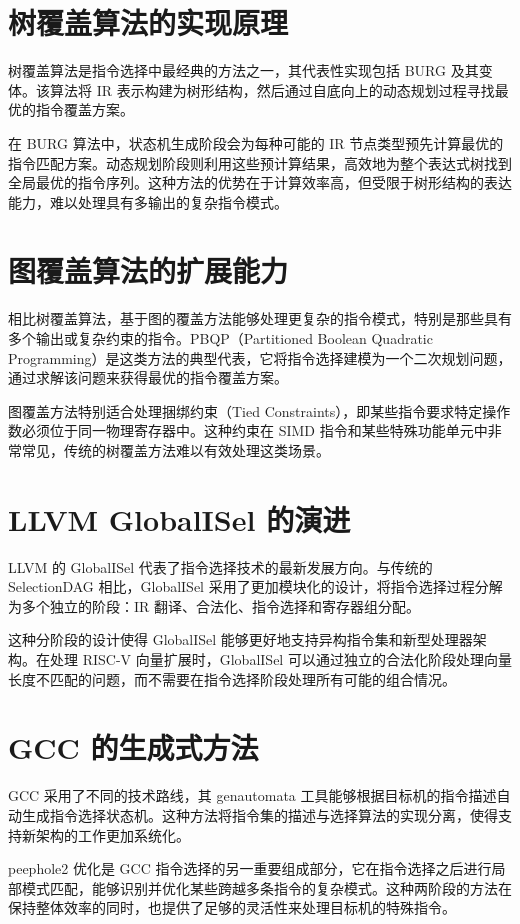 \section{树覆盖算法的实现原理}
树覆盖算法是指令选择中最经典的方法之一，其代表性实现包括 BURG 及其变体。该算法将 IR 表示构建为树形结构，然后通过自底向上的动态规划过程寻找最优的指令覆盖方案。\par
在 BURG 算法中，状态机生成阶段会为每种可能的 IR 节点类型预先计算最优的指令匹配方案。动态规划阶段则利用这些预计算结果，高效地为整个表达式树找到全局最优的指令序列。这种方法的优势在于计算效率高，但受限于树形结构的表达能力，难以处理具有多输出的复杂指令模式。\par
\section{图覆盖算法的扩展能力}
相比树覆盖算法，基于图的覆盖方法能够处理更复杂的指令模式，特别是那些具有多个输出或复杂约束的指令。PBQP（Partitioned Boolean Quadratic Programming）是这类方法的典型代表，它将指令选择建模为一个二次规划问题，通过求解该问题来获得最优的指令覆盖方案。\par
图覆盖方法特别适合处理捆绑约束（Tied Constraints），即某些指令要求特定操作数必须位于同一物理寄存器中。这种约束在 SIMD 指令和某些特殊功能单元中非常常见，传统的树覆盖方法难以有效处理这类场景。\par
\section{LLVM GlobalISel 的演进}
LLVM 的 GlobalISel 代表了指令选择技术的最新发展方向。与传统的 SelectionDAG 相比，GlobalISel 采用了更加模块化的设计，将指令选择过程分解为多个独立的阶段：IR 翻译、合法化、指令选择和寄存器组分配。\par
这种分阶段的设计使得 GlobalISel 能够更好地支持异构指令集和新型处理器架构。在处理 RISC-V 向量扩展时，GlobalISel 可以通过独立的合法化阶段处理向量长度不匹配的问题，而不需要在指令选择阶段处理所有可能的组合情况。\par
\section{GCC 的生成式方法}
GCC 采用了不同的技术路线，其 genautomata 工具能够根据目标机的指令描述自动生成指令选择状态机。这种方法将指令集的描述与选择算法的实现分离，使得支持新架构的工作更加系统化。\par
peephole2 优化是 GCC 指令选择的另一重要组成部分，它在指令选择之后进行局部模式匹配，能够识别并优化某些跨越多条指令的复杂模式。这种两阶段的方法在保持整体效率的同时，也提供了足够的灵活性来处理目标机的特殊指令。\par
